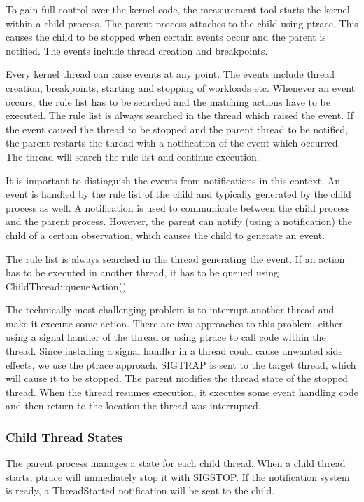 \documentclass[a4paper,12pt]{article}
\newlength{\imgwidth}
\newcommand{\umlDiagram}[1]{%
	\settowidth{\imgwidth}{\texttt{[image: out/diagrams/\#1.pdf]}}%
	\setlength{\imgwidth}{\minof{0.5\imgwidth}{\textwidth}}%
	\par\vskip0.5cm\noindent\makebox[\textwidth][c]{%
	\texttt{[image: out/diagrams/\#1.pdf]}%
}\vskip0.5cm}
\newcommand{\method}[1]{\textsf{#1}}
\begin{document}
To gain full control over the kernel code, the measurement tool starts the
kernel within a child process. The parent process attaches to the child using
ptrace. This causes the child to be stopped when certain events occur and the
parent is notified. The events include thread creation and breakpoints.

Every kernel thread can raise events at any point. The events include thread
creation, breakpoints, starting and stopping of workloads etc. Whenever an event
occurs, the rule list has to be searched and the matching actions have to be
executed. The rule list is always searched in the thread which raised the event.
If the event caused the thread to be stopped and the parent thread to be
notified, the parent restarts the thread with a notification of the event which
occurred. The thread will search the rule list and continue execution.

It is important to distinguish the events from notifications in this context. An
event is handled by the rule list of the child and typically generated by the
child process as well. A notification is used to communicate between the child
process and the parent process. However, the parent can notify (using a
notification) the child of a certain observation, which causes the child to
generate an event.

The rule list is always searched in the thread generating the event. If an
action has to be executed in another thread, it has to be queued using
\method{ChildThread::queueAction()}

The technically most challenging problem is to interrupt another thread and make
it execute some action. There are two approaches to this problem, either using a
signal handler of the thread or using ptrace to call code within the thread.
Since installing a signal handler in a thread could cause unwanted side effects,
we use the ptrace approach. SIGTRAP is sent to the target thread, which will
cause it to be stopped. The parent modifies the thread state of the stopped
thread. When the thread resumes execution, it executes some event handling code
and then return to the location the thread was interrupted.

\subsubsection{Child Thread States}
\umlDiagram{measuringCore/ChildState}
The parent process manages a state for each child thread. When a child thread
starts, ptrace will immediately stop it with SIGSTOP. If the notification system
is ready, a ThreadStarted notification will be sent to the child.
\end{document}
